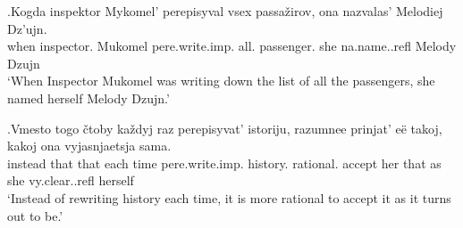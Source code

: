 \exg.\label{ex:pare:imp:distr}Kogda inspektor Mykomel' perepisyval vsex passa\v{z}irov, ona nazvalas' Melodiej Dz'ujn.\\
when inspector. Mukomel pere.write.imp. all. passenger. she na.name..refl Melody Dzujn\\
`When Inspector Mukomel was writing down the list of all the passengers, she named herself Melody Dzujn.'\\

\exg.\label{ex:pere:imp:iter}Vmesto togo \v{c}toby ka\v{z}dyj raz perepisyvat' istoriju, razumnee prinjat' e\"{e} takoj, kakoj ona vyjasnjaetsja sama.\\
instead that that each time pere.write.imp. history. rational. accept her that as she vy.clear..refl herself\\
\trans `Instead of rewriting history each time, it is more rational to accept it as it turns out to be.'\\

%

